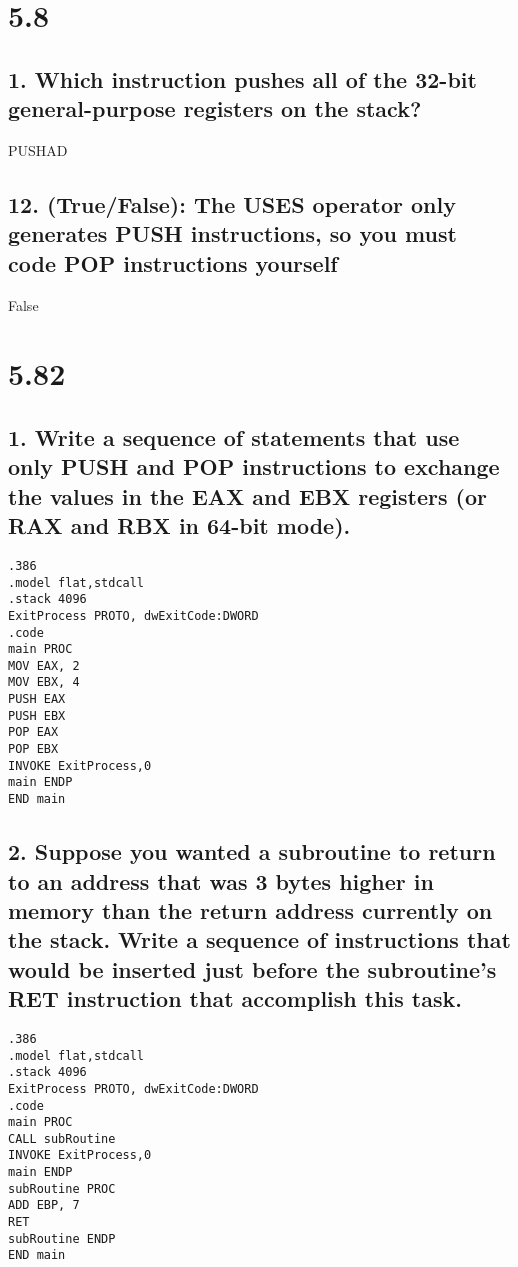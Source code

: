 \documentclass[12pt]{article}
\newcommand\tab[1][1cm]{\hspace{#1}}
\begin{document}
\section*{5.8}
\subsection*{1. Which instruction pushes all of the 32-bit general-purpose registers on the stack?}
PUSHAD
\subsection*{12. (True/False): The USES operator only generates PUSH instructions, so you must code POP instructions yourself}
False
\section*{5.82}
\subsection*{1. Write a sequence of statements that use only PUSH and POP instructions to exchange the values in the EAX and EBX registers (or RAX and RBX in 64-bit mode). }
\texttt{.386 \\
	.model flat,stdcall \\
	.stack 4096 \\
	ExitProcess PROTO, dwExitCode:DWORD \\
	.code \\
	main PROC \\
\tab	MOV EAX, 2 \\
\tab	MOV EBX, 4 \\
\tab	PUSH EAX \\
\tab	PUSH EBX \\
\tab	POP EAX \\
\tab	POP EBX \\
\tab	INVOKE ExitProcess,0 \\
\tab	main ENDP \\
	END main}
\subsection*{2. Suppose you wanted a subroutine to return to an address that was 3 bytes higher in memory than the return address currently on the stack. Write a sequence of instructions that would be inserted just before the subroutine’s RET instruction that accomplish this task.}
\texttt{.386 \\
	.model flat,stdcall \\
	.stack 4096 \\
	ExitProcess PROTO, dwExitCode:DWORD \\
	.code \\
	main PROC \\
	CALL subRoutine \\
	INVOKE ExitProcess,0 \\
	main ENDP \\
	subRoutine PROC \\
	ADD EBP, 7 \\
	RET \\
	subRoutine ENDP \\
	END main}
\end{document}
